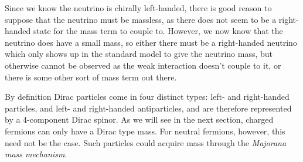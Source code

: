Since we know the neutrino is chirally left-handed, there is good reason to suppose that the neutrino must be massless, as there does not seem to be a right-handed state for the mass term to couple to. However, we now know that the neutrino does have a small mass, so either there must be a right-handed neutrino which only shows up in the standard model to give the neutrino mass, but otherwise cannot be observed as the weak interaction doesn’t couple to it, or there is some other sort  of mass term out there.

By definition Dirac particles come in four distinct types: left- and right-handed particles, and left- and right-handed antiparticles, and are therefore represented by a 4-component Dirac spinor. As we will see in the next section, charged fermions can only have a Dirac type mass. For neutral fermions, however, this need not be the case. Such particles could acquire mass through the \emph{Majorana mass mechanism}.